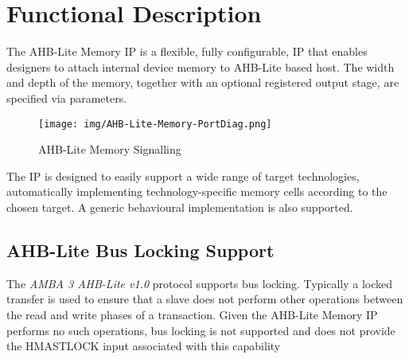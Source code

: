 \chapter{Functional Description}\label{functional-description}

The AHB-Lite Memory IP is a flexible, fully configurable, IP that enables designers to attach internal device memory to AHB-Lite based host. The width and depth of the memory, together with an optional registered output stage, are specified via parameters.

\begin{figure}[th]
	\centering
	\texttt{[image: img/AHB-Lite-Memory-PortDiag.png]}
	\caption{AHB-Lite Memory Signalling}
	\label{fig:ahb-lite-memory-portdiag}
\end{figure}

The IP is designed to easily support a wide range of target
technologies, automatically implementing technology-specific memory
cells according to the chosen target. A generic behavioural
implementation is also supported.

\section{AHB-Lite Bus Locking Support} \label{ahb-lite-bus-locking-support}

The \emph{AMBA 3 AHB-Lite v1.0} protocol supports bus locking. Typically a locked transfer is used to ensure that a slave does not perform other operations between the read and write phases of a transaction. Given the AHB-Lite Memory IP performs no such operations, bus locking is not supported and does not provide the HMASTLOCK input associated with this capability